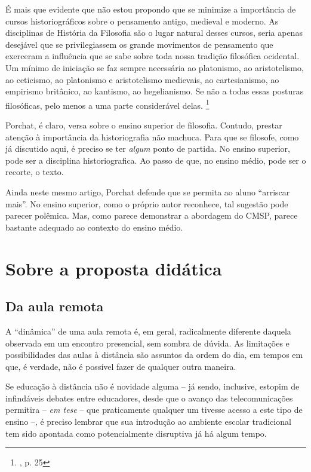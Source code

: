 \documentclass[12pt,a4paper]{article}
\newenvironment{citac}{\begin{addmargin}[4cm]{1em} \footnotesize}{\normalfont \end{addmargin}}
\begin{document}
	\begin{citac}
	É mais que evidente que não estou propondo que se minimize
	a importância de cursos historiográficos sobre o pensamento antigo,
	medieval e moderno. As disciplinas de História da Filosofia são o lugar
	natural desses cursos, seria apenas desejável que se privilegiassem os
	grande movimentos de pensamento que exerceram a influência que se
	sabe sobre toda nossa tradição filosófica ocidental. Um mínimo de
	iniciação se faz sempre necessária ao platonismo, ao aristotelismo, ao
	ceticismo, ao platonismo e aristotelismo medievais, ao cartesianismo,
	ao empirismo britânico, ao kantismo, ao hegelianismo. Se não a todas
	essas posturas filosóficas, pelo menos a uma parte considerável delas. 
		\footnote{\cite{porchat}, p. 25}
	\end{citac}

	Porchat, é claro, versa sobre o ensino superior de filosofia. 
	Contudo, prestar atenção à importância da historiografia não 
	machuca. Para que se filosofe, como já discutido aqui, é preciso 
	se ter \textit{algum} ponto de partida. No ensino superior, pode 
	ser a disciplina historiografica. Ao passo de que, no ensino 
	médio, pode ser o recorte, o texto. 

	Ainda neste mesmo artigo, Porchat defende que se permita ao aluno 
	“arriscar mais”. No ensino superior, como o próprio autor reconhece, 
	tal sugestão pode parecer polêmica. Mas, como parece demonstrar 
	a abordagem do CMSP, parece bastante adequado ao contexto do 
	ensino médio. 

	\newpage
	
	\section{Sobre a proposta didática}
	
	\subsection{Da aula remota}

	A “dinâmica” de uma aula remota é, em geral, radicalmente diferente 
	daquela observada em um encontro presencial, sem sombra de dúvida. 
	As limitações e possibilidades das aulas à distância são assuntos da 
	ordem do dia, em tempos em que, é verdade, não é possível fazer de 
	qualquer outra maneira.

	Se educação à distância não é novidade alguma -- já sendo, inclusive, 
	estopim de infindáveis debates entre educadores, desde que o avanço 
	das telecomunicações permitira -- \textit{em tese} -- que praticamente 
	qualquer um tivesse acesso 
	a este tipo de ensino --, é preciso lembrar que sua introdução ao 
	ambiente escolar tradicional tem sido apontada como potencialmente 
	disruptiva já há algum tempo. 
\end{document}
